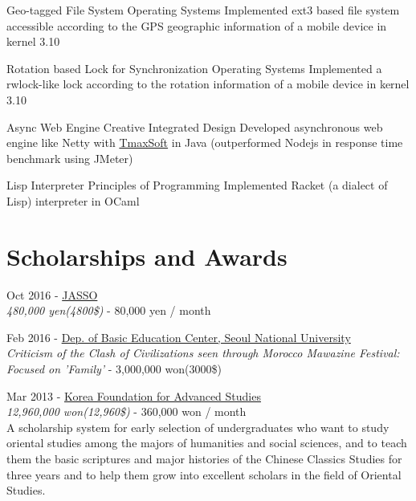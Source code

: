 \documentclass[10pt]{article} %
\begin{document}
\if{}
\project
{}
{Geo-tagged File System}
{Operating Systems}
{Implemented ext3 based file system accessible according to the GPS geographic information of a mobile device in kernel 3.10}

\project
{}
{Rotation based Lock for Synchronization}
{Operating Systems}
{Implemented a rwlock-like lock according to the rotation information of a mobile device in kernel 3.10}
\fi

\project
{}
{Async Web Engine}
{Creative Integrated Design}
{Developed asynchronous web engine like Netty with \href{https://kr.tmaxsoft.com/main.do}{TmaxSoft} in Java (outperformed Nodejs in response time benchmark using JMeter)}

\project
{}
{Lisp Interpreter}
{Principles of Programming}
{Implemented Racket (a dialect of Lisp) interpreter in OCaml}


\if{}
\section{Scholarships and Awards}

{
Oct 2016 - \href{http://www.jasso.go.jp/ryugaku/tantosha/study_a/short_term_h/index.html}{JASSO}\\
\textit{480,000 yen(4800\$)} - 80,000 yen / month\\
}

{
Feb 2016 - \href{http://liberaleduenglish.snu.ac.kr/}{Dep. of Basic Education Center, Seoul National University}\\
\textit{Criticism of the Clash of Civilizations seen through Morocco Mawazine Festival: Focused on 'Family'} - 3,000,000 won(3000\$)\\
}

{
Mar 2013 - \href{http://www.kfas.or.kr/?pCulture=en}{Korea Foundation for Advanced Studies}\\
\textit{12,960,000 won(12,960\$)} - 360,000 won / month\\
A scholarship system for early selection of undergraduates who want to study oriental studies among the majors of humanities and social sciences, and to teach them the basic scriptures and major histories of the Chinese Classics Studies for three years and to help them grow into excellent scholars in the field of Oriental Studies.
}
\end{document}
